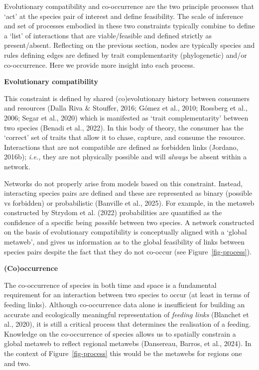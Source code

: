 \documentclass[
]{article}
\begin{document}
Evolutionary compatibility and co-occurrence are the two principle
processes that `act' at the species pair of interest and define
feasibility. The scale of inference and set of processes embodied in
these two constraints typically combine to define a `list' of
interactions that are viable/feasible and defined strictly as
present/absent. Reflecting on the previous section, nodes are typically
species and rules defining edges are defined by trait complementarity
(phylogenetic) and/or co-occurrence. Here we provide more insight into
each process.

\textbf{Evolutionary compatibility}

This constraint is defined by shared (co)evolutionary history between
consumers and resources (Dalla Riva \& Stouffer, 2016; Gómez et al.,
2010; Rossberg et al., 2006; Segar et al., 2020) which is manifested as
`trait complementarity' between two species (Benadi et al., 2022). In
this body of theory, the consumer has the `correct' set of traits that
allow it to chase, capture, and consume the resource. Interactions that
are not compatible are defined as forbidden links (Jordano, 2016b);
\emph{i.e.,} they are not physically possible and will \emph{always} be
absent within a network.

Networks do not properly arise from models based on this constraint.
Instead, interacting species pairs are defined and these are represented
as binary (possible vs forbidden) or probabilistic (Banville et al.,
2025). For example, in the metaweb constructed by Strydom et al. (2022)
probabilities are quantified as the confidence of a specific being
\emph{possible} between two species. A network constructed on the basis
of evolutionary compatibility is conceptually aligned with a `global
metaweb', and gives us information as to the global feasibility of links
between species pairs despite the fact that they do not co-occur (see
Figure~\ref{fig-process}).

\textbf{(Co)occurrence}

The co-occurrence of species in both time and space is a fundamental
requirement for an interaction between two species to occur (at least in
terms of feeding links). Although co-occurrence data alone is
insufficient for building an accurate and ecologically meaningful
representation of \emph{feeding links} (Blanchet et al., 2020), it is
still a critical process that determines the realisation of a feeding.
Knowledge on the co-occurrence of species allows us to spatially
constrain a global metaweb to reflect regional metawebs (Dansereau,
Barros, et al., 2024). In the context of Figure~\ref{fig-process} this
would be the metawebs for regions one and two.
\end{document}
